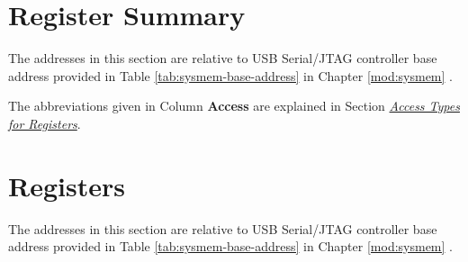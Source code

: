 \documentclass[main\_\_EN.tex]{subfiles}
\begin{document}



\clearpage
\hypertarget{usbserialjtag-reg-summ}{}
\section{Register Summary}
\label{sec:usbserialjtag-reg-summ}

The addresses in this section are relative to USB Serial/JTAG controller base address provided in Table \ref{tab:sysmem-base-address} in Chapter \ref{mod:sysmem} \textit{}.

The abbreviations given in Column \textbf{Access} are explained in Section \hyperref[glossary-access-types]{\textit{Access Types for Registers}}.






\clearpage
\section{Registers}

The addresses in this section are relative to USB Serial/JTAG controller base address provided in Table \ref{tab:sysmem-base-address} in Chapter \ref{mod:sysmem} \textit{}.


\end{document}
